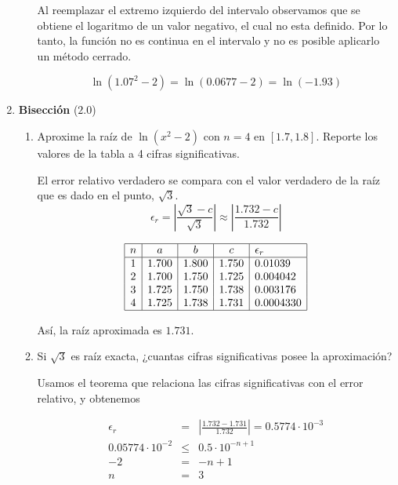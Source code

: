 \documentclass[12pt]{article}
\begin{document}
\begin{enumerate}[leftmargin=*,widest=9]
\begin{enumerate}[label=\alph*]
    Al reemplazar el extremo izquierdo del intervalo observamos que se obtiene el logaritmo de un valor negativo, el cual no esta definido. Por lo tanto, la función no es continua en el intervalo y no es posible aplicarlo un método cerrado.
    
   \[ \ln(1.07^2 - 2) = \ln(0.0677 -2 ) = \ln(-1.93) \]
    
    \end{enumerate}
   
    \item \textbf{Bisección} ($2.0$)
    
    \begin{enumerate}[label=\alph*]

    \item Aproxime la raíz de $\ln (x^2 - 2)$ con $n=4$ en $\left[1.7, 1.8\right]$. Reporte los valores de la tabla a 4 cifras significativas.
    
    El error relativo verdadero se compara con el valor verdadero de la raíz que es dado en el punto, $\sqrt{3}$.
    \[ \epsilon_r = \left| \frac{\sqrt{3} - c}{\sqrt{3}} \right| \approx \left|\frac{1.732 - c}{1.732} \right| \]
    
    \[
    \begin{array}{|c|c|c|c|l|}
    \hline
    n & a & b & c & \epsilon_r \\
    \hline
    1  & 1.700  & 1.800 & 1.750  & 0.01039\\
    2 &  1.700 & 1.750 & 1.725 & 0.004042\\
    3 & 1.725 & 1.750 & 1.738 & 0.003176\\
    4 & 1.725 & 1.738 & 1.731 & 0.0004330 \\
    \hline
    \end{array}
    \]
    
    Así, la raíz aproximada es $1.731$.
    
    
    \item Si $\sqrt{3}$ es raíz exacta, ¿cuantas cifras significativas posee la aproximación?
    
    Usamos el teorema que relaciona las cifras significativas con el error relativo, y obtenemos
    
    \begin{eqnarray*}
    \epsilon_r  & = & \left| \frac{1.732 - 1.731}{1.732} \right| = 0.5774\cdot 10^{-3}  \\
    0.05774\cdot 10^{-2} & \leq & 0.5 \cdot 10^{-n + 1} \\
    -2 & = & -n + 1 \\
    n & = & 3
    \end{eqnarray*}
    

\end{enumerate}
\end{enumerate}
\end{document}
